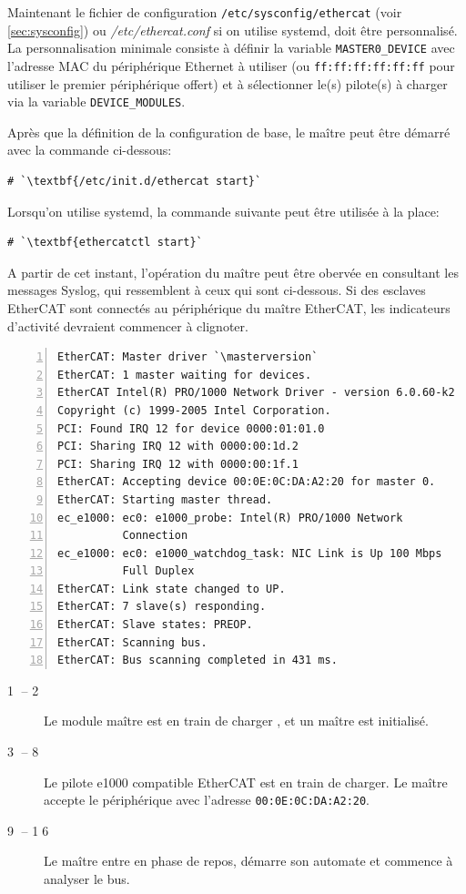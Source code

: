 \documentclass[a4paper,12pt,BCOR6mm,bibtotoc,idxtotoc]{scrbook}
\newcommand{\masterversion}{1.5.2}
\newcommand{\linenum}[1]{\normalfont\textcircled{\tiny #1}}
\begin{document}
Maintenant le fichier de configuration
\texttt{/etc/sysconfig/ethercat} (voir \autoref{sec:sysconfig}) ou
\textit{/etc/ethercat.conf} si on utilise systemd, doit \^etre
personnalis\'e.  La personnalisation minimale consiste \`a d\'efinir
la variable \lstinline+MASTER0_DEVICE+ avec l'adresse MAC du
p\'eriph\'erique Ethernet \`a utiliser (ou
\lstinline+ff:ff:ff:ff:ff:ff+ pour utiliser le premier
p\'eriph\'erique offert) et \`a s\'electionner le(s) pilote(s) \`a
charger via la variable \lstinline+DEVICE_MODULES+.

Apr\`es que la d\'efinition de la configuration de base, le ma\^itre
peut \^etre d\'emarr\'e avec la commande ci-dessous:

\begin{lstlisting}
# `\textbf{/etc/init.d/ethercat start}`
\end{lstlisting}

Lorsqu'on utilise systemd, la commande suivante peut \^etre utilis\'ee
\`a la place:

\begin{lstlisting}
# `\textbf{ethercatctl start}`
\end{lstlisting}

A partir de cet instant, l'op\'eration du ma\^itre peut \^etre oberv\'ee
en consultant les messages Syslog, qui ressemblent \`a
ceux qui sont ci-dessous. Si des esclaves EtherCAT sont connect\'es
au p\'eriph\'erique du ma\^itre EtherCAT, les indicateurs d'activit\'e
devraient commencer \`a clignoter.

\begin{lstlisting}[numbers=left]
EtherCAT: Master driver `\masterversion`
EtherCAT: 1 master waiting for devices.
EtherCAT Intel(R) PRO/1000 Network Driver - version 6.0.60-k2
Copyright (c) 1999-2005 Intel Corporation.
PCI: Found IRQ 12 for device 0000:01:01.0
PCI: Sharing IRQ 12 with 0000:00:1d.2
PCI: Sharing IRQ 12 with 0000:00:1f.1
EtherCAT: Accepting device 00:0E:0C:DA:A2:20 for master 0.
EtherCAT: Starting master thread.
ec_e1000: ec0: e1000_probe: Intel(R) PRO/1000 Network
          Connection
ec_e1000: ec0: e1000_watchdog_task: NIC Link is Up 100 Mbps
          Full Duplex
EtherCAT: Link state changed to UP.
EtherCAT: 7 slave(s) responding.
EtherCAT: Slave states: PREOP.
EtherCAT: Scanning bus.
EtherCAT: Bus scanning completed in 431 ms.
\end{lstlisting}

\begin{description}

\item[\linenum{1} -- \linenum{2}] Le module ma\^itre est en train de charger , et un ma\^itre est initialis\'e.

\item[\linenum{3} -- \linenum{8}] Le pilote e1000 compatible EtherCAT
  est en train de charger. Le ma\^itre accepte le p\'eriph\'erique avec
  l'adresse \lstinline+00:0E:0C:DA:A2:20+.

\item[\linenum{9} -- \linenum{16}] Le ma\^itre entre en phase de repos,
  d\'emarre son automate et commence \`a analyser le bus.

\end{description}
\end{document}
